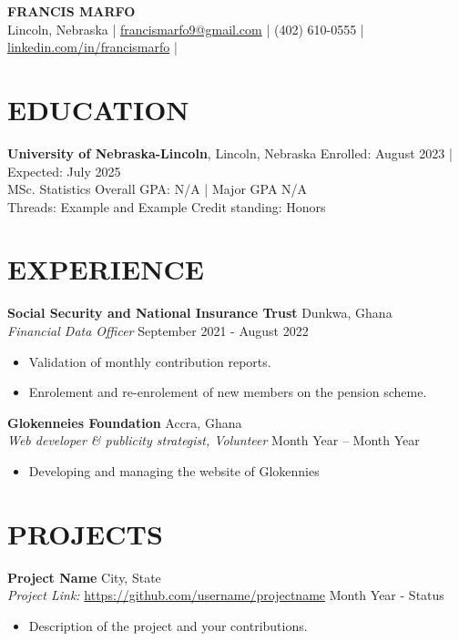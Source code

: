 \documentclass[a4paper,9pt]{extarticle}
\begin{document}
\pagestyle{empty}

\begin{center}
\textbf{\Large FRANCIS MARFO}\\[2pt] %
Lincoln, Nebraska | \href{mailto:francismarfo9@gmail.com}{francismarfo9@gmail.com} | (402) 610-0555 | \href{https://www.linkedin.com/in/johndoe}{linkedin.com/in/francismarfo} |
\end{center}

\section*{EDUCATION}
\noindent
\textbf{University of Nebraska-Lincoln}, Lincoln, Nebraska \hfill Enrolled: August 2023 | Expected: July 2025\\ %
MSc. Statistics \hfill Overall GPA: N/A | Major GPA N/A\\ %
Threads: Example and Example \hfill Credit standing: Honors %

\section*{EXPERIENCE}
\noindent
\textbf{Social Security and National Insurance Trust} \hfill Dunkwa, Ghana\\ %
\textit{Financial Data Officer} \hfill September 2021 - August 2022 %
\begin{itemize}
    \item Validation of monthly contribution reports.
     \item Enrolement and re-enrolement of new members on the pension scheme.%
\end{itemize}

\noindent
\textbf{Glokenneies Foundation} \hfill Accra, Ghana\\ %
\textit{Web developer \& publicity strategist, Volunteer} \hfill Month Year – Month Year %
\begin{itemize}
    \item Developing and managing the website of Glokennies %
\end{itemize}

\section*{PROJECTS}
\noindent
\textbf{Project Name} \hfill City, State\\ %
\textit{Project Link:} \url{https://github.com/username/projectname} \hfill Month Year - Status %
\begin{itemize}
    \item Description of the project and your contributions. %
\end{itemize}
\end{document}
